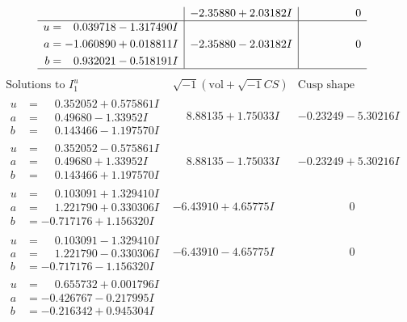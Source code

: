 \documentclass[1p]{elsarticle_modified}
\theoremstyle{definition}
\newcommand{\I}{\sqrt{-1}}
\begin{document}
$$\begin{array}{c|c|c}
 & -2.35880 + 2.03182 I & \phantom{-0.000000 } 0 \\ \hline\begin{aligned}
u &= \phantom{-}0.039718 - 1.317490 I \\
a &= -1.060890 + 0.018811 I \\
b &= \phantom{-}0.932021 - 0.518191 I\end{aligned}
 & -2.35880 - 2.03182 I & \phantom{-0.000000 } 0\\
 \hline 
 \end{array}$$\newpage$$\begin{array}{c|c|c}  
\text{Solutions to }I^u_{1}& \I (\text{vol} + \sqrt{-1}CS) & \text{Cusp shape}\\
 \hline 
\begin{aligned}
u &= \phantom{-}0.352052 + 0.575861 I \\
a &= \phantom{-}0.49680 - 1.33952 I \\
b &= \phantom{-}0.143466 - 1.197570 I\end{aligned}
 & \phantom{-}8.88135 + 1.75033 I & -0.23249 - 5.30216 I \\ \hline\begin{aligned}
u &= \phantom{-}0.352052 - 0.575861 I \\
a &= \phantom{-}0.49680 + 1.33952 I \\
b &= \phantom{-}0.143466 + 1.197570 I\end{aligned}
 & \phantom{-}8.88135 - 1.75033 I & -0.23249 + 5.30216 I \\ \hline\begin{aligned}
u &= \phantom{-}0.103091 + 1.329410 I \\
a &= \phantom{-}1.221790 + 0.330306 I \\
b &= -0.717176 + 1.156320 I\end{aligned}
 & -6.43910 + 4.65775 I & \phantom{-0.000000 } 0 \\ \hline\begin{aligned}
u &= \phantom{-}0.103091 - 1.329410 I \\
a &= \phantom{-}1.221790 - 0.330306 I \\
b &= -0.717176 - 1.156320 I\end{aligned}
 & -6.43910 - 4.65775 I & \phantom{-0.000000 } 0 \\ \hline\begin{aligned}
u &= \phantom{-}0.655732 + 0.001796 I \\
a &= -0.426767 - 0.217995 I \\
b &= -0.216342 + 0.945304 I\end{aligned}

\end{array}$$
\end{document}
